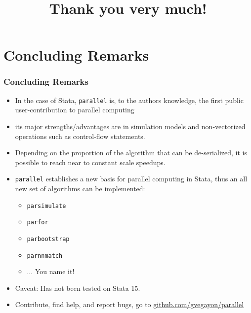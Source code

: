 \documentclass[9pt,\ExtraDocOpts]{beamer}
\begin{document}
\section{Concluding Remarks}

\begin{frame}
\frametitle{Concluding Remarks}

\begin{itemize}
\item In the case of Stata, {\tt parallel} is, to the authors knowledge, the first public user-contribution to parallel computing\pause
\item its major strengths/advantages are in simulation models and non-vectorized operations such as control-flow statements.\pause
\item Depending on the proportion of the algorithm that can be de-serialized, it is possible to reach near to constant scale speedups.\pause
\item {\tt parallel} establishes a new basis for parallel computing in Stata,\pause{}
thus an all new set of algorithms can be implemented:\pause
\begin{itemize}
\item {\tt parsimulate}\pause
\item {\tt parfor}\pause
\item {\tt parbootstrap}\pause
\item {\tt parnnmatch}\pause
\item ... {\large You name it!}
\end{itemize}
\item Caveat: Has not been tested on Stata 15.\pause
\item Contribute, find help, and report bugs, go to \href{http://github.com/gvegayon/parallel}{github.com/gvegayon/parallel}\pause

\end{itemize}

\end{frame}

\title{Thank you very much!}

\frame{\maketitle
}
\end{document}
